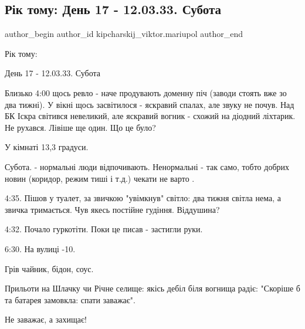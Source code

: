  
 
 
 
 

\subsection{Рік тому:  День 17 - 12.03.33. Субота}
\label{sec:12_03_2023.fb.kipcharskij_viktor.mariupol.1.r_k_tomu___den_17___}

\ifcmt
 author_begin
   author_id kipcharskij_viktor.mariupol
 author_end
\fi

Рік тому: 

День 17 - 12.03.33. Субота

Близько 4:00 щось ревло - наче продувають доменну піч (заводи стоять вже зо два
тижні). У вікні щось засвітилося - яскравий спалах, але звуку не почув. Над БК
Іскра світився невеликий, але яскравий вогник - схожий на діодний ліхтарик. Не
рухався. Лівіше ще один. Що це було?

У кімнаті 13,3 градуси.

Субота. - нормальні люди відпочивають. Ненормальні - так само, тобто добрих
новин (коридор, режим тиші і т.д.) чекати не варто .

4:35. Пішов у туалет, за звичкою "увімкнув" світло: два тижня світла нема, а
звичка тримається. Чув якесь постійне гудіння. Віддушина?

4:32. Почало гуркотіти. Поки це писав - застигли руки.

6:30. На вулиці -10.

Грів чайник, бідон, соус.

Прильоти на Шлачку чи Річне селище: якісь дебіл біля вогнища радіє: "Скоріше б
та батарея замовкла: спати заважає".

Не заважає, а захищає!



